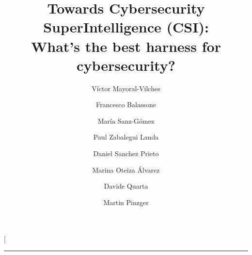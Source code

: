 \documentclass[9pt]{extarticle}
\makeatletter
\newcommand{\todo}[1]{} %
\let\orig@maketitle\maketitle
\renewcommand{\maketitle}{%
  \orig@maketitle%
  \vspace{-1.5em}%
  {\color{cai_primary!30}\hrule height 0.5pt}%
  \vspace{1em}%
}
\makeatother
\begin{document}

\title{\LARGE\textcolor{cai_primary}{\textbf{Towards Cybersecurity SuperIntelligence (CSI): \\What's the best harness for cybersecurity?}}}

\author[1,$\dagger$]{V\'ictor Mayoral-Vilches}
\author[1]{Francesco Balassone}
\author[1]{Mar\'ia Sanz-G\'omez}
\author[1]{Paul Zabalegui Landa}
\author[1]{Daniel Sanchez Prieto}
\author[1]{Marina Oteiza Álvarez}
\author[1]{Davide Quarta}
\author[2]{Martin Pinzger}



\date{}
\twocolumn[
\maketitle

\todo{[review C3.1] tex/ still ships \textasciitilde15 inactive .tex files from a different paper (fig\_alias\_progression and fig\_alias\_heatmap\_full are now activated by the new model-context appendix; the remaining ones include dynamic\_cyber\_ranges.tex, MHBench.tex, CR.tex, PRO.tex, appendix\_mhbench.tex, fig\_blackboard.tex, fig\_alias\_heatmap.tex, fig\_radar\_complementarity.tex, experimental\_setup.tex); move them to tex/\_unused/ before source upload, update project CLAUDE.md to describe this paper.}
\todo{[review C3.1 followup] the new model-context appendix cites mayoralvilchescybersuper2026 three times for figures the paper relies on, but the bib entry is marked "In preparation"; either upgrade to a published/arXiv reference at submission time or weaken the framing (e.g.\ "internal Alias Robotics technical note").}

\todo{[review C6.2] "CSI" denotes (i) the research direction (title), (ii) the meta-scaffold software (abstract), and (iii) a scaffold prefix (CSI::Claude); add a defining sentence at first use in \S1.}

\todo{[review C5.1] "we benchmark five scaffolds" is misleading: only four are aggregated in every table (scoreboard, ensemble, jaccard, bbresults, bbactivity); Mistral is a case study, not benchmarked end-to-end. Rewrite as "we benchmark four scaffolds end-to-end and report a fifth (CSI::Mistral) as an independent case study". Same fix in \S1 contribution 1.}
\end{document}
